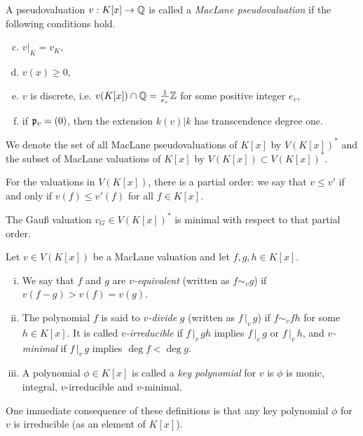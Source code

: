 \begin{definition}
    A pseudovaluation $v: K[x] \to \mathbb Q$ is called a \textit{MacLane pseudovaluation} if the following conditions hold.
    \begin{enumerate}[(a)]
        \setcounter{enumi}{2}
        \item $v|_K = v_K$,
        \item $v(x) \geq 0$,
        \item $v$ is discrete, i.e. $v(K[x]) \cap \mathbb Q = \frac{1}{e_v}\mathbb Z$ for some positive integer $e_v$,
        \item if $\mathfrak p_v = (0)$, then the extension $k(v)|k$ has transcendence degree one.
    \end{enumerate}
    We denote the set of all MacLane pseudovaluations of $K[x]$ by $V(K[x])^*$ and the subset of MacLane valuations of $K[x]$ by $V(K[x]) \subset V(K[x])^*$.
\end{definition}

For the valuations in $V(K[x])$, there is a partial order: we say that $v \leq v'$ if and only if $v(f) \leq v'(f)$ for all $f\in K[x]$.

\begin{example}
    The Gauß valuation $v_{\scriptscriptstyle G} \in V(K[x])^*$ is minimal with respect to that partial order.
\end{example}

\begin{definition}
    Let $v\in V(K[x])$ be a MacLane valuation and let $f,g,h \in K[x]$.
    \begin{enumerate}[(i)]
        \item We say that $f$ and $g$ are \textit{$v$-equivalent} (written as $f \sim_v g$) if $v(f-g) > v(f) = v(g)$.
        \item The polynomial $f$ is said to \textit{$v$-divide} $g$ (written as $f\, |_v\, g$) if $f \sim_v fh$ for some $h \in K[x]$.
            It is called \textit{$v$-irreducible} if $f\, |_v\, gh$ implies $f\, |_v\, g$ or $f\, |_v\, h$,
            and \textit{$v$-minimal} if $f\, |_v\, g$ implies $\deg f < \deg g$.
        \item A polynomial $\phi \in K[x]$ is called a \textit{key polynomial} for $v$ is $\phi$ is monic, integral, $v$-irreducible and $v$-minimal.
    \end{enumerate}
\end{definition}

\begin{remark}
    One immediate consequence of these definitions is that any key polynomial $\phi$ for $v$ is irreducible (as an element of $K[x]$).
\end{remark}

